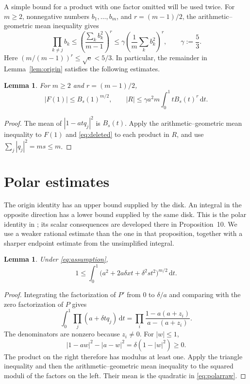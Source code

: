 \documentclass[11pt,letterpaper,reqno]{amsart}
\newtheorem{lem}[thm]{Lemma}
\theoremstyle{definition}
\numberwithin{equation}{section}
\newcommand{\dd}{\,\mathrm d}
\newcommand{\e}{\mathrm e}
\begin{document}
A simple bound for a product with one factor omitted will be used twice. For $m\ge2$, nonnegative numbers $b_1,\ldots,b_m$, and $r=(m-1)/2$, the arithmetic--geometric mean inequality gives
\begin{equation}\label{eq:deleted}
 \prod_{k\ne j}b_k
 \le\left(\frac{\sum_kb_k^2}{m-1}\right)^r
 \le\gamma\left(\frac1m\sum_kb_k^2\right)^r,
 \qquad \gamma:=\frac53.
\end{equation}
Here $(m/(m-1))^r\le\sqrt{\e}<5/3$. In particular, the remainder in Lemma~\ref{lem:origin} satisfies the following estimates.

\begin{lem}\label{lem:rawerrors}
For $m\ge2$ and $r=(m-1)/2$,
\begin{equation}\label{eq:rawerrors}
 |F(1)|\le B_s(1)^{m/2},\qquad
 |R|\le\gamma a^2m\int_0^1tB_s(t)^r\dd t.
\end{equation}
\end{lem}

\begin{proof}
The mean of $|1-atq_j|^2$ is $B_s(t)$. Apply the arithmetic--geometric mean inequality to $F(1)$ and \eqref{eq:deleted} to each product in $R$, and use $\sum_j|q_j|^2=ms\le m$.
\end{proof}

\section{Polar estimates}\label{sec:polar}

The origin identity has an upper bound supplied by the disk. An integral in the opposite direction has a lower bound supplied by the same disk. This is the polar identity in \cite[Lemma~6, (8)]{Tao26}; its scalar consequences are developed there in Proposition~10. We use a weaker rational estimate than the one in that proposition, together with a sharper endpoint estimate from the unsimplified integral.

\begin{lem}\label{lem:polar}
Under \eqref{eq:assumption},
\begin{equation}\label{eq:polarraw}
 1\le\int_0^1\bigl(a^2+2a\delta xt+\delta^2st^2\bigr)^{m/2}\dd t.
\end{equation}
\end{lem}

\begin{proof}
Integrating the factorization of $P'$ from $0$ to $\delta/a$ and comparing with the zero factorization of $P$ gives
\[
 \int_0^1\prod_j(a+\delta tq_j)\dd t
 =\prod_i\frac{1-a(a+z_i)}{a-(a+z_i)}.
\]
The denominators are nonzero because $z_i\ne0$. For $|w|\le1$,
\[
 |1-aw|^2-|a-w|^2=\delta(1-|w|^2)\ge0.
\]
The product on the right therefore has modulus at least one. Apply the triangle inequality and then the arithmetic--geometric mean inequality to the squared moduli of the factors on the left. Their mean is the quadratic in \eqref{eq:polarraw}.
\end{proof}
\end{document}
